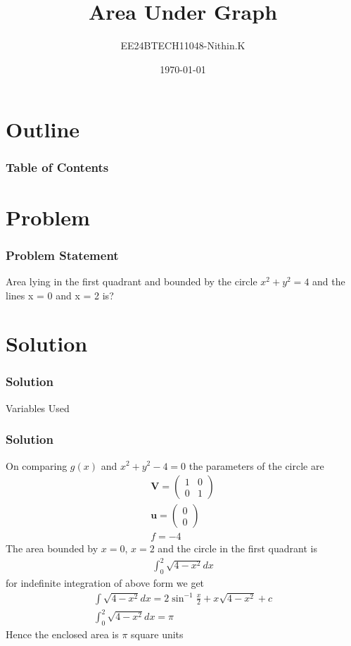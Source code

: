 \documentclass{beamer}
\title{Area Under Graph}
\author{EE24BTECH11048-Nithin.K}
\date{\today}
\providecommand{\brak}[1]{\ensuremath{\left(#1\right)}}
\theoremstyle{remark}
\newcommand{\myvec}[1]{\ensuremath{\begin{pmatrix}#1\end{pmatrix}}}
\let\vec\mathbf
\numberwithin{equation}{section}
\begin{document}
\begin{frame}
\titlepage
\end{frame}

\section*{Outline}
\begin{frame}
	\frametitle{Table of Contents}
	\tableofcontents
\end{frame}

\section{Problem}
\begin{frame}
	\frametitle{Problem Statement}
	Area lying in the first quadrant and bounded by the circle $x^2 + y^2 = 4$ and the lines x = 0 and x = 2 is?
\end{frame}

\section{Solution}
\begin{frame}
	\frametitle{Solution}
		\begin{table}[H]
			\centering
			\resizebox{\textwidth}{!}{
				
			}
			\caption{Variables Used}
		\end{table}
\end{frame}

\begin{frame}
	\frametitle{Solution}
	\small
	On comparing $g\brak{x}$ and $x^2 + y^2 - 4 = 0$ the parameters of the circle are
	\begin{align}
		\vec{V} = \myvec{ 1 & 0 \\
		0 & 1 } \\
		\vec{u} = \myvec{0 \\
		0 } \\
		f = -4
	\end{align}
	The area bounded by $x=0$, $x=2$ and the circle in the first quadrant is
	\begin{align}
		\int_{0}^{2}\sqrt{4 - x^2} dx
	\end{align}
	for indefinite integration of above form we get
	\begin{align}
		\int\sqrt{4 - x^2} dx = 2\sin^{-1}\frac{x}{2} + x\sqrt{4 - x^2} + c \\
		\int_{0}^{2}\sqrt{4 - x^2} dx = \pi
	\end{align}
	Hence the enclosed area is $\pi$ square units
\end{frame}
\end{document}
